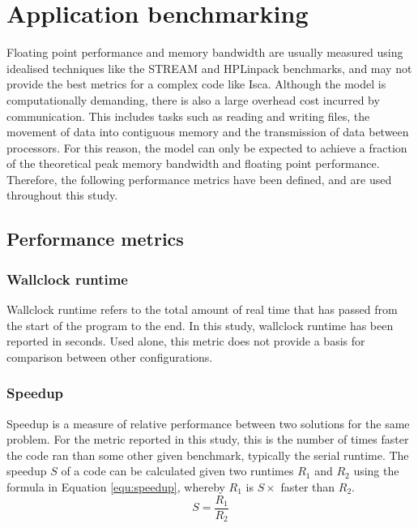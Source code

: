 \documentclass[a4paper,11pt]{report}
\begin{document}
\section{Application benchmarking}
Floating point performance and memory bandwidth are usually measured using idealised techniques like the STREAM and HPLinpack benchmarks, and may not provide the best metrics for a complex code like Isca. Although the model is computationally demanding, there is also a large overhead cost incurred by communication. This includes tasks such as reading and writing files, the movement of data into contiguous memory and the transmission of data between processors. For this reason, the model can only be expected to achieve a fraction of the theoretical peak memory bandwidth and floating point performance. Therefore, the following performance metrics have been defined, and are used throughout this study.
\subsection{Performance metrics}

\subsubsection{Wallclock runtime} 
Wallclock runtime refers to the total amount of real time that has passed from the start of the program to the end. In this study, wallclock runtime has been reported in seconds. Used alone, this metric does not provide a basis for comparison between other configurations. 
	
\subsubsection{Speedup} 
Speedup is a measure of relative performance between two solutions for the same problem. For the metric reported in this study, this is the number of times faster the code ran than some other given benchmark, typically the serial runtime. The speedup $S$ of a code can be calculated given two runtimes $R_1$ and $R_2$ using the formula in Equation \ref{equ:speedup}, whereby $R_1$ is $S\times$ faster than $R_2$.
\begin{equation}
S = \frac{R_1}{R_2} 
\label{equ:speedup}
\end{equation}
	
\end{document}
